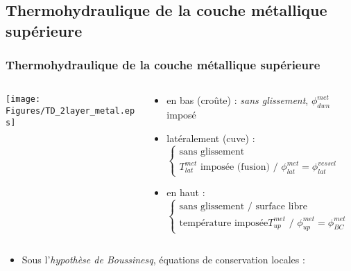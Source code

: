 \subsection{Thermohydraulique de la couche métallique supérieure}
\begin{frame}[fragile]
\frametitle{Thermohydraulique de la couche métallique supérieure}
\begin{columns}[T]
    \begin{column}{0.3\textwidth}
\baselineskip
\centering \texttt{[image: Figures/TD\_2layer\_metal.eps]}
    \end{column}
    \begin{column}{0.7\textwidth}  
    \begin{scriptsize}
    \begin{itemize}
    \item en bas (croûte) : \textit{sans glissement}, $\phi^{met}_{dwn}$ imposé
    \item latéralement (cuve) : {\scriptsize $\left\{\begin{array}{l} \text{sans glissement} \\ T^{met}_{lat} \text{ imposée (fusion) / } \phi^{met}_{lat}=\phi^{vessel}_{lat} \end{array}\right.$}
    \item en haut : {\scriptsize $\left\{\begin{array}{l} \text{sans glissement / surface libre} \\ \text{température imposée} T^{met}_{up} \text{ / } \phi^{met}_{up}=\phi^{met}_{BC} \end{array}\right.$}
    \end{itemize} 
    \end{scriptsize}
    \end{column}
\end{columns}
\begin{itemize}
\item Sous l'\emph{hypothèse de Boussinesq}, équations de conservation locales :
\begin{columns}[T]
    \begin{column}{0.58\textwidth}
\end{column}
\end{columns}
\end{itemize}
\end{frame}
